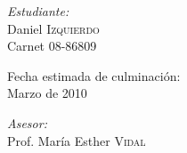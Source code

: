 \begin{titlepage}
\begin{minipage}{0.3\textwidth}
\begin{flushleft}
\emph{Estudiante:} \\
Daniel \textsc{Izquierdo} \\
Carnet 08-86809 \\
\end{flushleft}
\end{minipage}
\begin{minipage}{0.3\textwidth}
\begin{center}
Fecha estimada de culminación: \\
Marzo de 2010
\end{center}
\end{minipage}
\begin{minipage}{0.3\textwidth}
\begin{flushright}
\emph{Asesor:} \\
Prof. María Esther \textsc{Vidal}
\end{flushright}
\end{minipage}

\end{titlepage}
